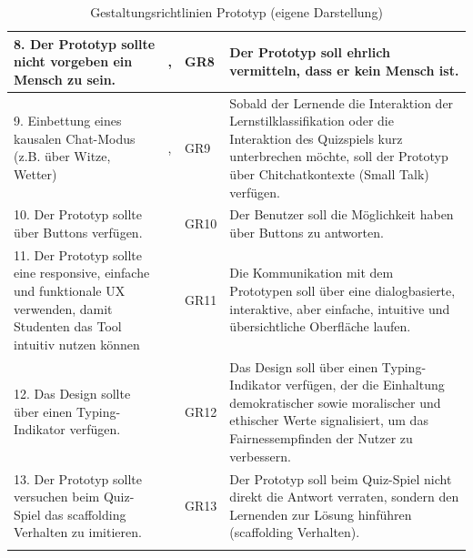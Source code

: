 \begin{longtable}{|m{4.75cm}|m{3.5cm}|m{1cm}|m{4.75cm}|}
8. Der Prototyp sollte nicht vorgeben ein Mensch zu sein. & \parencite[1]{villar.2017}, \parencite[1]{neill.2018}&GR8& Der Prototyp soll ehrlich vermitteln, dass er kein Mensch ist. \\ \hline

9. Einbettung eines kausalen Chat-Modus (z.B. über Witze, Wetter) &\parencite[7]{Wambsganß.2020}, \parencite[9]{Jain.2018}&GR9& Sobald der Lernende die Interaktion der Lernstilklassifikation oder die Interaktion des Quizspiels kurz unterbrechen möchte, soll der Prototyp über Chitchatkontexte (Small Talk) verfügen. \\ \hline

10. Der Prototyp sollte über Buttons verfügen. &\parencite[8]{Jain.2018}&GR10&  Der Benutzer soll die Möglichkeit haben über Buttons zu antworten. \\ \hline

11. Der Prototyp sollte eine responsive, einfache und funktionale UX verwenden, damit Studenten das Tool intuitiv nutzen können & \parencite[7]{Wambsganß.2020} &GR11& Die Kommunikation mit dem Prototypen soll über eine dialogbasierte, interaktive, aber einfache, intuitive und übersichtliche Oberfläche laufen.\\ \hline

12. Das Design sollte über einen Typing-Indikator verfügen. & \parencite[10 f.]{Wambsganß.2021} &GR12&  Das Design soll über einen Typing-Indikator verfügen, der die Einhaltung demokratischer sowie moralischer und ethischer Werte signalisiert, um das Fairnessempfinden der Nutzer zu verbessern.  \\ \hline

13. Der Prototyp sollte versuchen beim Quiz-Spiel das scaffolding Verhalten zu imitieren.& \parencite[4 f.]{winkler_hobert_salovaara_söllner_leimeister_2020} &GR13& Der Prototyp soll beim Quiz-Spiel nicht direkt die Antwort verraten, sondern den Lernenden zur Lösung hinführen (scaffolding Verhalten).\\ \hline

\caption[Gestaltungsrichtlinien Prototyp]{Gestaltungsrichtlinien Prototyp (eigene Darstellung)} 
\label{tab:/Gestaltungsrichtlinien_Prototyp} 
\end{longtable}
\endgroup

